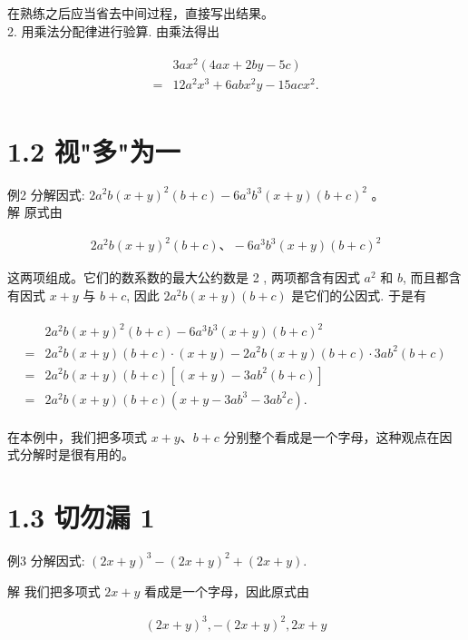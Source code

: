 \documentclass[10pt]{article}
\begin{document}
在熟练之后应当省去中间过程，直接写出结果。\\
2. 用乘法分配律进行验算. 由乘法得出

\begin{align*}
\begin{aligned}
& 3 a x^{2}(4 a x+2 b y-5 c) \\
= & 12 a^{2} x^{3}+6 a b x^{2} y-15 a c x^{2} .
\end{aligned}
\end{align*}

\section*{1.2 视"多"为一}
例2 分解因式: $2 a^{2} b(x+y)^{2}(b+c)-6 a^{3} b^{3}(x+y)(b+c)^{2}$ 。\\
解 原式由

\begin{align*}
2 a^{2} b(x+y)^{2}(b+c) 、-6 a^{3} b^{3}(x+y)(b+c)^{2}
\end{align*}

这两项组成。它们的数系数的最大公约数是 2 , 两项都含有因式 $a^{2}$ 和 $b$, 而且都含有因式 $x+y$ 与 $b+c$, 因此 $2 a^{2} b(x+y)(b+c)$ 是它们的公因式. 于是有

\begin{align*}
\begin{aligned}
& 2 a^{2} b(x+y)^{2}(b+c)-6 a^{3} b^{3}(x+y)(b+c)^{2} \\
= & 2 a^{2} b(x+y)(b+c) \cdot(x+y)-2 a^{2} b(x+y)(b+c) \cdot 3 a b^{2}(b+c) \\
= & 2 a^{2} b(x+y)(b+c)\left[(x+y)-3 a b^{2}(b+c)\right] \\
= & 2 a^{2} b(x+y)(b+c)\left(x+y-3 a b^{3}-3 a b^{2} c\right) .
\end{aligned}
\end{align*}

在本例中，我们把多项式 $x+y 、 b+c$ 分别整个看成是一个字母，这种观点在因式分解时是很有用的。

\section*{1.3 切勿漏 1}
例3 分解因式: $(2 x+y)^{3}-(2 x+y)^{2}+(2 x+y)$.

解 我们把多项式 $2 x+y$ 看成是一个字母，因此原式由

\begin{align*}
(2 x+y)^{3},-(2 x+y)^{2}, 2 x+y
\end{align*}
\end{document}
